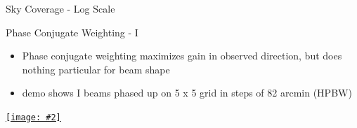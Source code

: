 \documentclass[pdf,azure,slideColor,colorBG]{prosper}
\newcommand{\moviewithpreview}[3]{%
    \pdfmark[{\texttt{[image: \#2]}}]{%
    pdfmark=/ANN,Subtype=/Movie,Movie=<< /F (#3) >>,%
    Activation=<< /ShowControls true /Mode /Repeat >>}}
\newcommand{\movie}[3]{%
    \pdfmark[{\hbox to #1 {\vbox to #2 { }}}]{%
    pdfmark=/ANN,Subtype=/Movie,Movie=<< /F (#3) /Poster true >>,%
    Activation=<< /ShowControls true /Mode /Repeat >>}}
\newcommand{\hrefWithPreview}[3]{%
  \href{#3}{\texttt{[image: \#2]}}
}
\begin{document}
\begin{slide}{Sky Coverage - Log Scale}
{\centering
{}
\par}
\end{slide}                             

\begin{slide}{Phase Conjugate Weighting - I}
\begin{small}
\begin{itemize}
\item Phase conjugate weighting maximizes gain in observed
direction, but does nothing particular for beam shape
\item demo shows I beams phased up on 5 x 5 grid in steps of 82 arcmin (HPBW)
\end{itemize}
\end {small}
   \begin{center}
      \hrefWithPreview{4cm}{I_1.ps}{run:movies/I.gif}

   \end{center}
\end{slide}
\end{document}
